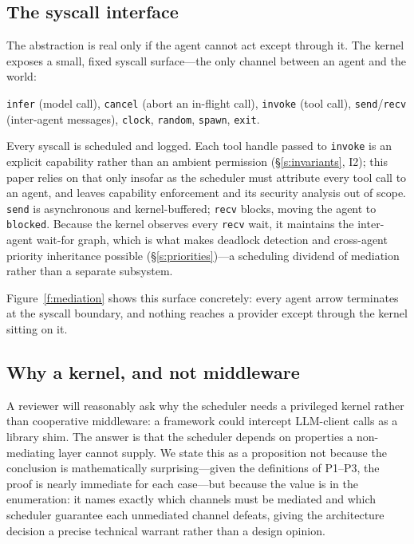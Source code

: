 \documentclass[letterpaper,11pt,leqno]{article}
\begin{document}
\subsection{The syscall interface}\label{s:syscall}

The abstraction is real only if the agent cannot act except through it. The kernel exposes a small, fixed syscall surface---the only channel between an agent and the world:

\texttt{infer} (model call), \texttt{cancel} (abort an in-flight call), \texttt{invoke} (tool call), \texttt{send}/\texttt{recv} (inter-agent messages), \texttt{clock}, \texttt{random}, \texttt{spawn}, \texttt{exit}.

Every syscall is scheduled and logged. Each tool handle passed to \texttt{invoke} is an explicit capability rather than an ambient permission (\S\ref{s:invariants}, I2); this paper relies on that only insofar as the scheduler must attribute every tool call to an agent, and leaves capability enforcement and its security analysis out of scope. \texttt{send} is asynchronous and kernel-buffered; \texttt{recv} blocks, moving the agent to \texttt{blocked}. Because the kernel observes every \texttt{recv} wait, it maintains the inter-agent wait-for graph, which is what makes deadlock detection and cross-agent priority inheritance possible (\S\ref{s:priorities})---a scheduling dividend of mediation rather than a separate subsystem.

Figure~\ref{f:mediation} shows this surface concretely: every agent arrow terminates at the syscall boundary, and nothing reaches a provider except through the kernel sitting on it.

\subsection{Why a kernel, and not middleware}\label{s:mediation}

A reviewer will reasonably ask why the scheduler needs a privileged kernel rather than cooperative middleware: a framework could intercept LLM-client calls as a library shim. The answer is that the scheduler depends on properties a non-mediating layer cannot supply. We state this as a proposition not because the conclusion is mathematically surprising---given the definitions of P1--P3, the proof is nearly immediate for each case---but because the value is in the enumeration: it names exactly which channels must be mediated and which scheduler guarantee each unmediated channel defeats, giving the architecture decision a precise technical warrant rather than a design opinion.
\end{document}
